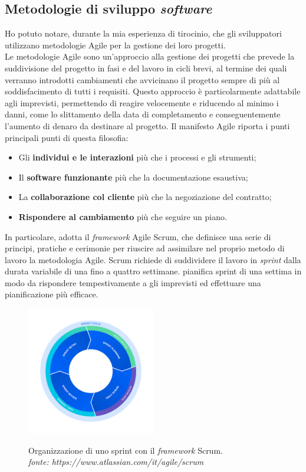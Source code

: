 \subsection{Metodologie di sviluppo \textit{software}}
Ho potuto notare, durante la mia esperienza di tirocinio, che gli sviluppatori utilizzano metodologie Agile per la gestione dei loro progetti.\\
Le metodologie Agile sono un'approccio alla gestione dei progetti che prevede la suddivisione del progetto 
in fasi e del lavoro in cicli brevi, al termine dei quali verranno introdotti cambiamenti che avvicinano il 
progetto sempre di più al soddisfacimento di tutti i requisiti. Questo approccio è particolarmente adattabile agli imprevisti, permettendo di reagire velocemente 
e riducendo al minimo i danni, come lo slittamento della data di completamento e conseguentemente l'aumento di denaro da destinare al progetto. 
Il manifesto Agile riporta i punti principali punti di questa filosofia:
\begin{itemize}
      \item Gli \textbf{individui e le interazioni} più che i processi e gli strumenti;
      \item Il \textbf{software funzionante} più che la documentazione esaustiva;
      \item La \textbf{collaborazione col cliente} più che la negoziazione del contratto;
      \item \textbf{Rispondere al cambiamento} più che seguire un piano.
\end{itemize}
In particolare, {\company} adotta il \textit{framework} Agile Scrum, che definisce una 
serie di principi, pratiche e cerimonie per riuscire ad assimilare nel proprio metodo di lavoro la metodologia Agile. 
Scrum richiede di suddividere il lavoro in \textit{sprint} dalla durata variabile di una fino a quattro settimane. {\company} pianifica
sprint di una settima in modo da rispondere tempestivamente a gli imprevisti ed effettuare una pianificazione più efficace.

\begin{figure}[H]
      \centering
      \includegraphics[alt={Organizzazione di uno sprint con il \textit{framework} Scrum}, width=0.5\textwidth]{img/scrum.png}
      \caption[Organizzazione di uno sprint con il \textit{framework} Scrum]
              {Organizzazione di uno sprint con il \textit{framework} Scrum. \\ \textit{fonte: https://www.atlassian.com/it/agile/scrum}}
      \label{fig:scrum}
  \end{figure}

